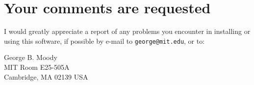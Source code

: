 
\section*{Your comments are requested}

I would greatly appreciate a report of any problems you encounter in installing
or using this software, if possible by e-mail to {\tt george@mit.edu},
or to:
\begin{center}
George B. Moody\\MIT Room E25-505A\\Cambridge, MA 02139 USA
\end{center}

